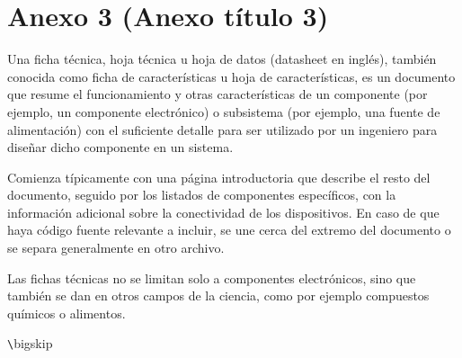 \chapter{Anexo 3 (Anexo título 3)}\label{anexo3}

Una ficha técnica, hoja técnica u hoja de datos (datasheet en inglés), también conocida como ficha de características u hoja de características, es un documento que resume el funcionamiento y otras características de un componente (por ejemplo, un componente electrónico) o subsistema (por ejemplo, una fuente de alimentación) con el suficiente detalle para ser utilizado por un ingeniero para diseñar dicho componente en un sistema.

Comienza típicamente con una página introductoria que describe el resto del documento, seguido por los listados de componentes específicos, con la información adicional sobre la conectividad de los dispositivos. En caso de que haya código fuente relevante a incluir, se une cerca del extremo del documento o se separa generalmente en otro archivo.

Las fichas técnicas no se limitan solo a componentes electrónicos, sino que también se dan en otros campos de la ciencia, como por ejemplo compuestos químicos o alimentos.

\verb+\+bigskip





\endinput 